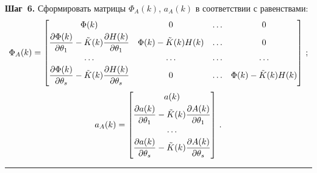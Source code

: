 \textbf{Шаг~6.} Сформировать матрицы $\Phi_A(k)$, $a_A(k)$ в соответствии с
равенствами:
  $$
  \Phi_A(k) =
  \begin{bmatrix}
  \Phi(k) & 0 & \ldots & 0\\[3pt]
  \fr{\partial\Phi(k)}{\partial\theta_1} -\tilde{K}(k)\fr{\partial
H(k)}{\partial\theta_1} & \Phi(k)-\tilde{K}(k)H(k) &\ldots & 0\\[3pt]
  \ldots &\ldots &\ldots &\ldots\\[3pt]
  \fr{\partial\Phi(k)}{\partial\theta_s}-\tilde{K}(k)\fr{\partial H(k)}{\partial
\theta_s} & 0 &\ldots & \Phi(k)-\tilde{K}(k)H(k)
  \end{bmatrix}\,;
  $$
  $$
  a_A(k)=
  \begin{bmatrix}
  a(k)\\[3pt]
  \fr{\partial a(k)}{\partial\theta_1}-\tilde{K}(k)\fr{\partial A(k)}{\partial\theta_1}\\[3pt]
  \ldots\\[3pt]
  \fr{\partial a(k)}{\partial\theta_s}-\tilde{K}(k)\fr{\partial A(k)}{\partial\theta_s}
  \end{bmatrix}\,.
  $$
  
  \vspace*{6pt}
  
    \hrule
  
  \smallskip

